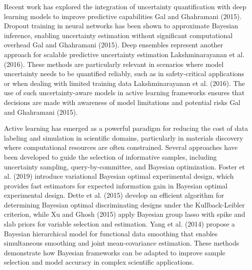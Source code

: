 Recent work has explored the integration of uncertainty quantification with deep learning models to improve predictive capabilities Gal and Ghahramani (2015). Dropout training in neural networks has been shown to approximate Bayesian inference, enabling uncertainty estimation without significant computational overhead Gal and Ghahramani (2015). Deep ensembles represent another approach for scalable predictive uncertainty estimation Lakshminarayanan et al. (2016). These methods are particularly relevant in scenarios where model uncertainty needs to be quantified reliably, such as in safety-critical applications or when dealing with limited training data Lakshminarayanan et al. (2016). The use of such uncertainty-aware models in active learning frameworks ensures that decisions are made with awareness of model limitations and potential risks Gal and Ghahramani (2015).

Active learning has emerged as a powerful paradigm for reducing the cost of data labeling and simulation in scientific domains, particularly in materials discovery where computational resources are often constrained. Several approaches have been developed to guide the selection of informative samples, including uncertainty sampling, query-by-committee, and Bayesian optimization. Foster et al. (2019) introduce variational Bayesian optimal experimental design, which provides fast estimators for expected information gain in Bayesian optimal experimental design. Dette et al. (2015) develop an efficient algorithm for determining Bayesian optimal discriminating designs under the Kullback-Leibler criterion, while Xu and Ghosh (2015) apply Bayesian group lasso with spike and slab priors for variable selection and estimation. Yang et al. (2014) propose a Bayesian hierarchical model for functional data smoothing that enables simultaneous smoothing and joint mean-covariance estimation. These methods demonstrate how Bayesian frameworks can be adapted to improve sample selection and model accuracy in complex scientific applications.

